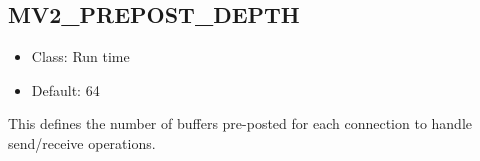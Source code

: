 \subsection{MV2\_PREPOST\_DEPTH}
\label{def:nem-rdma-prepost-depth}

\begin{itemize}
    \item Class: Run time

    \item Default: 64
\end{itemize}

This defines the number of buffers pre-posted for each connection to
handle send/receive operations.

% 
% 
% 
% 
% 

%

